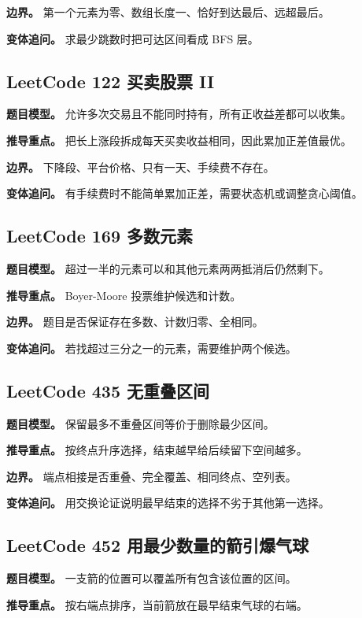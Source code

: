 \textbf{边界。} 第一个元素为零、数组长度一、恰好到达最后、远超最后。

\textbf{变体追问。} 求最少跳数时把可达区间看成 BFS 层。

\subsection{LeetCode 122 买卖股票 II}

\textbf{题目模型。} 允许多次交易且不能同时持有，所有正收益差都可以收集。

\textbf{推导重点。} 把长上涨段拆成每天买卖收益相同，因此累加正差值最优。

\textbf{边界。} 下降段、平台价格、只有一天、手续费不存在。

\textbf{变体追问。} 有手续费时不能简单累加正差，需要状态机或调整贪心阈值。

\subsection{LeetCode 169 多数元素}

\textbf{题目模型。} 超过一半的元素可以和其他元素两两抵消后仍然剩下。

\textbf{推导重点。} Boyer-Moore 投票维护候选和计数。

\textbf{边界。} 题目是否保证存在多数、计数归零、全相同。

\textbf{变体追问。} 若找超过三分之一的元素，需要维护两个候选。

\subsection{LeetCode 435 无重叠区间}

\textbf{题目模型。} 保留最多不重叠区间等价于删除最少区间。

\textbf{推导重点。} 按终点升序选择，结束越早给后续留下空间越多。

\textbf{边界。} 端点相接是否重叠、完全覆盖、相同终点、空列表。

\textbf{变体追问。} 用交换论证说明最早结束的选择不劣于其他第一选择。

\subsection{LeetCode 452 用最少数量的箭引爆气球}

\textbf{题目模型。} 一支箭的位置可以覆盖所有包含该位置的区间。

\textbf{推导重点。} 按右端点排序，当前箭放在最早结束气球的右端。


